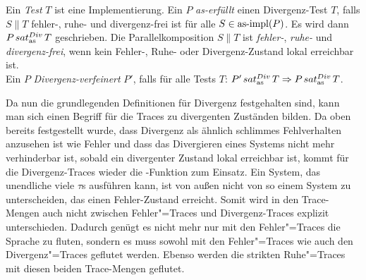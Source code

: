 

\begin{Def}
  \label{DivTestDef}
  Ein \emph{Test} $T$ ist eine Implementierung. Ein \MEIO{} $P$
  \emph{as-erfüllt} einen Divergenz-Test $T$, falls $S\|T$ fehler-, ruhe- und
  divergenz-frei ist für alle $S\in \mathrm{as}\text{-}\mathrm{impl} (P)$. Es wird dann $P\hspace{0.05cm}sat_\mathrm{as}^{Div}\hspace{0.05cm} T$
  geschrieben. Die Parallelkomposition $S\|T$ ist \emph{fehler-}, \emph{ruhe-}
  und \emph{divergenz-frei}, wenn kein Fehler-, Ruhe- oder Divergenz-Zustand
  lokal erreichbar ist.\\
  Ein \MEIO{} $P$ \emph{Divergenz-verfeinert} $P'$, falls für alle Tests $T$:
  $P'\hspace{0.05cm}sat_\mathrm{as}^{Div}\hspace{0.05cm} T \Rightarrow P\hspace{0.05cm}sat_\mathrm{as}^{Div}\hspace{0.05cm} T$.
\end{Def}

Da nun die grundlegenden Definitionen für Divergenz festgehalten sind, kann man
sich einen Begriff für die Traces zu divergenten Zuständen bilden. Da oben
bereits festgestellt wurde, dass Divergenz als ähnlich \glqq schlimmes
Fehlverhalten\grqq{} anzusehen ist wie Fehler und dass das Divergieren eines
Systems nicht mehr verhinderbar ist, sobald ein divergenter Zustand lokal
erreichbar ist, kommt für die Divergenz-Traces wieder die \prune{}-Funktion zum
Einsatz. Ein System, das unendliche viele $\tau$s ausführen kann, ist von außen
nicht von so einem System zu unterscheiden, das einen Fehler-Zustand erreicht.
Somit wird in den Trace-Mengen auch nicht zwischen Fehler"=Traces und
Divergenz-Traces explizit unterschieden. Dadurch genügt es nicht mehr nur mit
den Fehler"=Traces die Sprache zu fluten, sondern es muss sowohl mit den
Fehler"=Traces wie auch den Divergenz"=Traces geflutet werden. Ebenso werden
die strikten Ruhe"=Traces mit diesen beiden Trace-Mengen geflutet.

